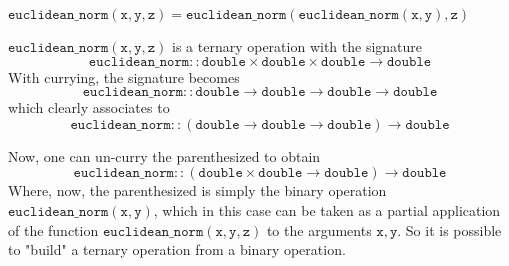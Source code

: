 \begin{Lemma}
    $\mathtt{euclidean\_norm(x, y, z) = euclidean\_norm(euclidean\_norm(x, y), z)}$
\end{Lemma}

\begin{solution}
    $\mathtt{euclidean\_norm(x, y, z)}$ is a ternary operation with the signature
    $$\mathtt{euclidean\_norm :: double \times double \times double \rightarrow double}$$
    With currying, the signature becomes
    $$\mathtt{euclidean\_norm :: double \rightarrow double \rightarrow double \rightarrow double}$$
    which clearly associates to
    $$\mathtt{euclidean\_norm :: \left(double \rightarrow double \rightarrow double\right) \rightarrow double}$$

    Now, one can un-curry the parenthesized to obtain
    $$\mathtt{euclidean\_norm :: \left(double \times double \rightarrow double\right) \rightarrow double}$$
    Where, now, the parenthesized is simply the binary operation $\mathtt{euclidean\_norm(x, y)}$, which in this case
    can be taken as a partial application of the function $\mathtt{euclidean\_norm(x,y,z)}$ to the arguments
    $\mathtt{x, y}$. So it is possible to "build" a ternary operation from a binary operation.
\end{solution}